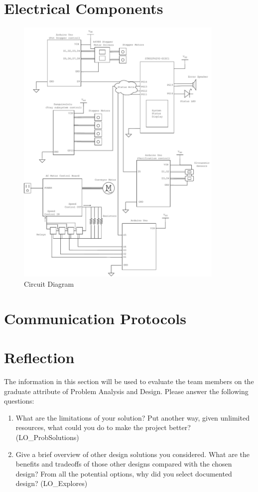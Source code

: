 \documentclass[12pt, titlepage]{article}
\begin{document}
\section{Electrical Components}

\begin{figure}[H]
  \centering
  \includegraphics[width=0.89\textwidth]{circuit_diagram.pdf}
  \caption{Circuit Diagram}
  \label{fig:circuit}
\end{figure}

\section{Communication Protocols}

\section{Reflection}

The information in this section will be used to evaluate the team members on the
graduate attribute of Problem Analysis and Design.  Please answer the following questions:

\begin{enumerate}
  \item What are the limitations of your solution?  Put another way, given
  unlimited resources, what could you do to make the project better? (LO\_ProbSolutions)
  \item Give a brief overview of other design solutions you considered.  What
  are the benefits and tradeoffs of those other designs compared with the chosen
  design?  From all the potential options, why did you select documented design?
  (LO\_Explores)
\end{enumerate}
\end{document}
